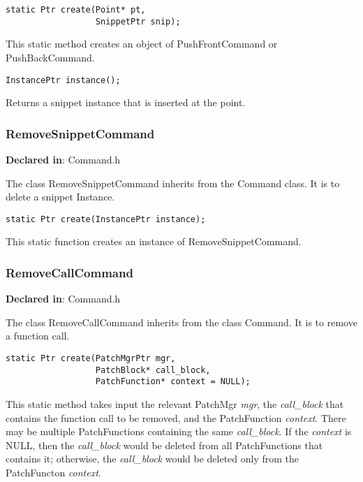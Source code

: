 \begin{verbatim}
static Ptr create(Point* pt,
                  SnippetPtr snip);

\end{verbatim}



This static method creates an object of PushFrontCommand or PushBackCommand.


\begin{verbatim}
InstancePtr instance();

\end{verbatim}



Returns a snippet instance that is inserted at the point.

\subsubsection{RemoveSnippetCommand}
\label{sec-3.3.2}

\textbf{Declared in}: Command.h

The class RemoveSnippetCommand inherits from the Command class. It is to delete
a snippet Instance.


\begin{verbatim}
static Ptr create(InstancePtr instance);

\end{verbatim}



This static function creates an instance of RemoveSnippetCommand.

\subsubsection{RemoveCallCommand}
\label{sec-3.3.3}

\textbf{Declared in}: Command.h

The class RemoveCallCommand inherits from the class Command. It is to remove a
function call.


\begin{verbatim}
static Ptr create(PatchMgrPtr mgr,
                  PatchBlock* call_block,
                  PatchFunction* context = NULL);

\end{verbatim}



This static method takes input the relevant PatchMgr \emph{mgr}, the \emph{call\_block}
that contains the function call to be removed, and the PatchFunction \emph{context}.
There may be multiple PatchFunctions containing the same \emph{call\_block}. If the
\emph{context} is NULL, then the \emph{call\_block} would be deleted from all
PatchFunctions that contains it; otherwise, the \emph{call\_block} would be deleted
only from the PatchFuncton \emph{context}.

